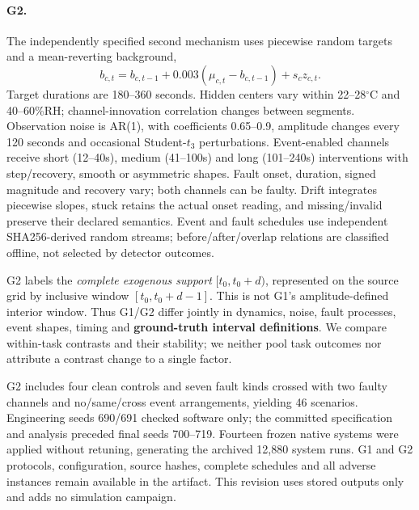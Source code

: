 \documentclass[10pt]{article}
\begin{document}
\paragraph{G2.}
The independently specified second mechanism uses piecewise random targets and a mean-reverting background,
\begin{equation}
b_{c,t}=b_{c,t-1}+0.003(\mu_{c,t}-b_{c,t-1})+s_cz_{c,t}.
\end{equation}
Target durations are 180--360 seconds. Hidden centers vary within 22--28$^\circ$C and 40--60\%RH; channel-innovation correlation changes between segments. Observation noise is AR(1), with coefficients 0.65--0.9, amplitude changes every 120 seconds and occasional Student-$t_3$ perturbations. Event-enabled channels receive short (12--40s), medium (41--100s) and long (101--240s) interventions with step/recovery, smooth or asymmetric shapes. Fault onset, duration, signed magnitude and recovery vary; both channels can be faulty. Drift integrates piecewise slopes, stuck retains the actual onset reading, and missing/invalid preserve their declared semantics. Event and fault schedules use independent SHA256-derived random streams; before/after/overlap relations are classified offline, not selected by detector outcomes.

G2 labels the \emph{complete exogenous support} $[t_0,t_0+d)$, represented on the source grid by inclusive window $[t_0,t_0+d-1]$. This is not G1's amplitude-defined interior window. Thus G1/G2 differ jointly in dynamics, noise, fault processes, event shapes, timing and \textbf{ground-truth interval definitions}. We compare within-task contrasts and their stability; we neither pool task outcomes nor attribute a contrast change to a single factor.

G2 includes four clean controls and seven fault kinds crossed with two faulty channels and no/same/cross event arrangements, yielding 46 scenarios. Engineering seeds 690/691 checked software only; the committed specification and analysis preceded final seeds 700--719. Fourteen frozen native systems were applied without retuning, generating the archived 12,880 system runs. G1 and G2 protocols, configuration, source hashes, complete schedules and all adverse instances remain available in the artifact. This revision uses stored outputs only and adds no simulation campaign.
\end{document}
